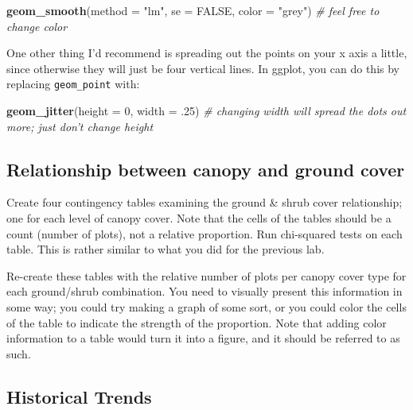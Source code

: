 \documentclass[]{book}
\newenvironment{Shaded}{\begin{snugshade}}{\end{snugshade}}
\newcommand{\KeywordTok}[1]{\textcolor[rgb]{0.13,0.29,0.53}{\textbf{#1}}}
\newcommand{\DataTypeTok}[1]{\textcolor[rgb]{0.13,0.29,0.53}{#1}}
\newcommand{\DecValTok}[1]{\textcolor[rgb]{0.00,0.00,0.81}{#1}}
\newcommand{\StringTok}[1]{\textcolor[rgb]{0.31,0.60,0.02}{#1}}
\newcommand{\CommentTok}[1]{\textcolor[rgb]{0.56,0.35,0.01}{\textit{#1}}}
\newcommand{\OtherTok}[1]{\textcolor[rgb]{0.56,0.35,0.01}{#1}}
\newcommand{\NormalTok}[1]{#1}
\begin{document}
\begin{Shaded}
\begin{Highlighting}[]
  \KeywordTok{geom_smooth}\NormalTok{(}\DataTypeTok{method =} \StringTok{"lm"}\NormalTok{, }\DataTypeTok{se =} \OtherTok{FALSE}\NormalTok{, }\DataTypeTok{color =} \StringTok{"grey"}\NormalTok{) }
  \CommentTok{# feel free to change color}
\end{Highlighting}
\end{Shaded}

One other thing I'd recommend is spreading out the points on your x axis
a little, since otherwise they will just be four vertical lines. In
ggplot, you can do this by replacing \texttt{geom\_point} with:

\begin{Shaded}
\begin{Highlighting}[]
  \KeywordTok{geom_jitter}\NormalTok{(}\DataTypeTok{height =} \DecValTok{0}\NormalTok{, }\DataTypeTok{width =}\NormalTok{ .}\DecValTok{25}\NormalTok{) }
  \CommentTok{# changing width will spread the dots out more; just don't change height}
\end{Highlighting}
\end{Shaded}

\subsection{Relationship between canopy and ground
cover}\label{relationship-between-canopy-and-ground-cover}

Create four contingency tables examining the ground \& shrub cover
relationship; one for each level of canopy cover. Note that the cells of
the tables should be a count (number of plots), not a relative
proportion. Run chi-squared tests on each table. This is rather similar
to what you did for the previous lab.

Re-create these tables with the relative number of plots per canopy
cover type for each ground/shrub combination. You need to visually
present this information in some way; you could try making a graph of
some sort, or you could color the cells of the table to indicate the
strength of the proportion. Note that adding color information to a
table would turn it into a figure, and it should be referred to as such.

\subsection{Historical Trends}\label{historical-trends}
\end{document}
